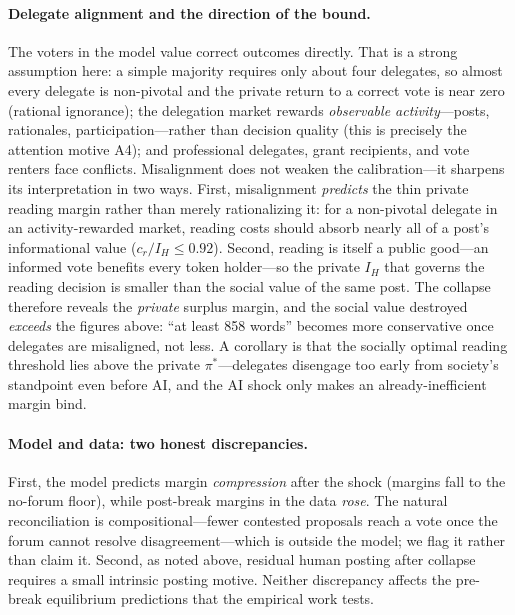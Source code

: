 \documentclass[12pt]{article}
\begin{document}
\paragraph{Delegate alignment and the direction of the bound.}
The voters in the model value correct outcomes directly. That is a strong assumption here: a simple majority requires only about four delegates, so almost every delegate is non-pivotal and the private return to a correct vote is near zero (rational ignorance); the delegation market rewards \emph{observable activity}---posts, rationales, participation---rather than decision quality (this is precisely the attention motive A4); and professional delegates, grant recipients, and vote renters face conflicts. Misalignment does not weaken the calibration---it sharpens its interpretation in two ways. First, misalignment \emph{predicts} the thin private reading margin rather than merely rationalizing it: for a non-pivotal delegate in an activity-rewarded market, reading costs should absorb nearly all of a post's informational value ($c_r/I_H \le 0.92$). Second, reading is itself a public good---an informed vote benefits every token holder---so the private $I_H$ that governs the reading decision is smaller than the social value of the same post. The collapse therefore reveals the \emph{private} surplus margin, and the social value destroyed \emph{exceeds} the figures above: ``at least 858 words'' becomes more conservative once delegates are misaligned, not less. A corollary is that the socially optimal reading threshold lies above the private $\pi^*$---delegates disengage too early from society's standpoint even before AI, and the AI shock only makes an already-inefficient margin bind.

\paragraph{Model and data: two honest discrepancies.} First, the model predicts margin \emph{compression} after the shock (margins fall to the no-forum floor), while post-break margins in the data \emph{rose}. The natural reconciliation is compositional---fewer contested proposals reach a vote once the forum cannot resolve disagreement---which is outside the model; we flag it rather than claim it. Second, as noted above, residual human posting after collapse requires a small intrinsic posting motive. Neither discrepancy affects the pre-break equilibrium predictions that the empirical work tests.

\end{document}
